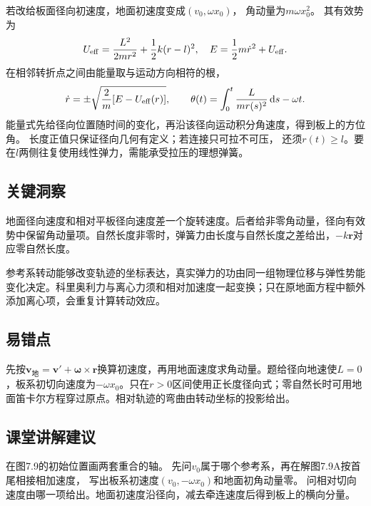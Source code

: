 \documentclass[UTF8,fontset=fandol,a4paper,11pt]{ctexart}
\newcommand{\dd}{\mathop{}\!\mathrm{d}}
\begin{document}
若改给板面径向初速度，地面初速度变成$(v_0,\omega x_0)$，
角动量为$m\omega x_0^2$。
其有效势为
\[
U_{\rm eff}=\frac{L^2}{2mr^2}+\frac12k(r-l)^2,
\quad E=\frac12m\dot r^2+U_{\rm eff}.
\]
在相邻转折点之间由能量取与运动方向相符的根，
\[
\dot r=\pm\sqrt{\frac2m[E-U_{\rm eff}(r)]},\qquad
\theta(t)=\int_0^t\frac{L}{mr(s)^2}\dd s-\omega t.
\]
能量式先给径向位置随时间的变化，再沿该径向运动积分角速度，得到板上的方位角。
长度正值只保证径向几何有定义；若连接只可拉不可压，
还须$r(t)\ge l$。要在$l$两侧往复使用线性弹力，需能承受拉压的理想弹簧。




\subsection*{关键洞察}

地面径向速度和相对平板径向速度差一个旋转速度。后者给非零角动量，径向有效势中保留角动量项。自然长度非零时，弹簧力由长度与自然长度之差给出，\(-k\mathbf r\)对应零自然长度。

参考系转动能够改变轨迹的坐标表达，真实弹力的功由同一组物理位移与弹性势能变化决定。科里奥利力与离心力须和相对加速度一起变换；只在原地面方程中额外添加离心项，会重复计算转动效应。




\subsection*{易错点}

先按$\boldsymbol v_{\text{地}}=\boldsymbol v\prime+\boldsymbol\omega\times\boldsymbol r$换算初速度，再用地面速度求角动量。题给径向地速使$L=0$，板系初切向速度为$-\omega x_0$。只在$r>0$区间使用正长度径向式；零自然长时可用地面笛卡尔方程穿过原点。相对轨迹的弯曲由转动坐标的投影给出。




\subsection*{课堂讲解建议}

在图7.9的初始位置画两套重合的轴。
先问$v_0$属于哪个参考系，再在解图7.9A按首尾相接相加速度，
写出板系初速度$(v_0,-\omega x_0)$和地面初角动量零。
问相对切向速度由哪一项给出。地面初速度沿径向，减去牵连速度后得到板上的横向分量。
\end{document}
